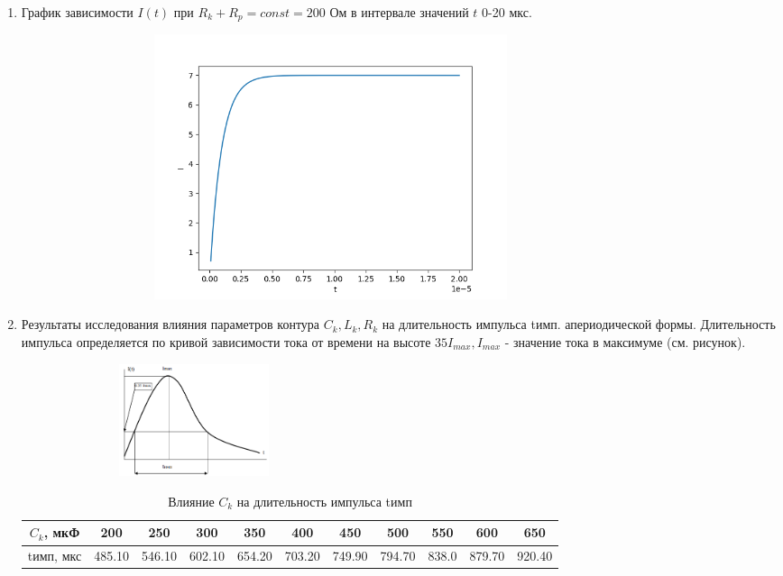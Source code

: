 \begin{enumerate}
	\item График зависимости $I(t)$ при $R_k + R_p = const = 200$ Ом в интервале значений $t$ 0-20 мкс.
	
	\begin{figure}[h]
		\begin{center}
			{\includegraphics[height=7.76cm, width = 16cm]{tasks/task_3}}
		\end{center}
	\end{figure}
	
	\item Результаты исследования влияния параметров контура $C_k, L_k, R_k$ на длительность импульса tимп. апериодической формы. Длительность импульса определяется по кривой зависимости тока от времени на высоте
	$35 I_{max}, I_{max}$ - значение тока в максимуме (см. рисунок).
	
	\begin{figure}[h]
		\begin{center}
			{\includegraphics[height=3.3cm, width =8cm]{graph}}
		\end{center}
	\end{figure}
	
	\begin{table}[ph!]\label{table_3}
		\caption{Влияние $C_k$ на длительность импульса tимп}
		\centering
		\begin{tabular}{|c|c|c|c|c|c|c|c|c|c|c|}
			\hline
			$C_k$, мкФ & 200 & 250 & 300 & 350 & 400 & 450 & 500 & 550 & 600 & 650\\
			\hline
			tимп, мкс & 485.10 & 546.10 & 602.10 & 654.20 & 703.20 & 749.90 & 794.70 & 838.0 & 879.70 & 920.40\\
			\hline	
		\end{tabular}
	\end{table}
	

\end{enumerate}
